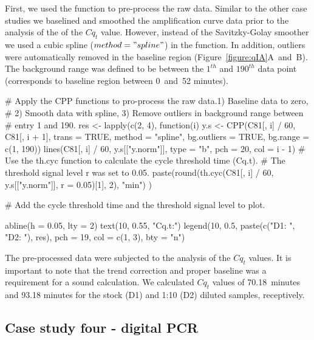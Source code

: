 First, we used the  function to pre-process the raw data. Similar to 
the other case studies we baselined and smoothed the amplification curve data 
prior to the analysis of the of the $Cq_{t}$ value. However, instead of the 
Savitzky-Golay smoother we used a cubic spline ($method = "spline"$) in the 
 function. In addition, outliers were automatically removed in the 
baseline region (Figure~\ref{figure:qIA}A~and~B). The background range was 
defined to be between the $1^{th}$ and $190^{th}$ data point (corresponds to 
baseline region between 0~and~52 minutes).

\begin{example}
  # Apply the CPP functions to pro-process the raw data.1) Baseline data to zero, 
  # 2) Smooth data with spline, 3) Remove outliers in background range between 
  # entry 1 and 190.
res <- lapply(c(2, 4), function(i) {
  y.s <- CPP(C81[, i] / 60, C81[, i + 1],
             trans = TRUE, 
             method = "spline",
             bg.outliers = TRUE,
             bg.range = c(1, 190))
  lines(C81[, i] / 60, y.s[["y.norm"]], type = "b", pch = 20, col = i - 1)
  # Use the th.cyc function to calculate the cycle threshold time (Cq.t). 
  # The threshold signal level r was set to 0.05.
  paste(round(th.cyc(C81[, i] / 60, y.s[["y.norm"]], r = 0.05)[1], 2), "min")
})

# Add the cycle threshold time and the threshold signal level to plot.

abline(h = 0.05, lty = 2)
text(10, 0.55, "Cq.t:")
legend(10, 0.5, paste(c("D1: ", "D2: "), res), pch = 19, col = c(1, 3), 
       bty = "n")
\end{example}

The pre-processed data were subjected to the analysis of the $Cq_{t}$ values. It 
is important to note that the trend correction and proper baseline was a 
requirement for a sound calculation. We calculated $Cq_{t}$ 
values of 70.18~minutes and 93.18 minutes for the stock (D1) and 1:10 (D2) 
diluted samples, receptively.

\subsection{Case study four - digital PCR}

